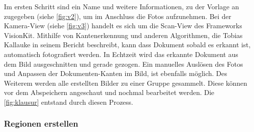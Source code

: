 \documentclass[notables, nomenclature, oneside, 150]{HSMW-Thesis}
\begin{document}
			Im ersten Schritt sind ein Name und weitere Informationen, zu der Vorlage an zugegeben (siehe \ref{fig:v2}), um im Anschluss die Fotos aufzunehmen. Bei der Kamera-View (siehe \ref{fig:v3}) handelt es sich um die Scan-View des Frameworks VisionKit. Mithilfe von Kantenerkennung und anderen Algorithmen, die Tobias Kallauke in seinem Bericht beschreibt, kann dass Dokument sobald es erkannt ist, automatisch fotografiert werden. In Echtzeit wird das erkannte Dokument aus dem Bild ausgeschnitten und gerade gezogen. Ein manuelles Auslösen des Fotos und Anpassen der Dokumenten-Kanten im Bild, ist ebenfalls möglich. Des Weiterem werden alle erstellten Bilder zu einer Gruppe gesammelt. Diese können vor dem Abspeichern angeschaut und nochmal bearbeitet werden. Die \autoref{fig:klausur} entstand durch diesen Prozess.
			
			\subsubsection*{Regionen erstellen}
\end{document}
